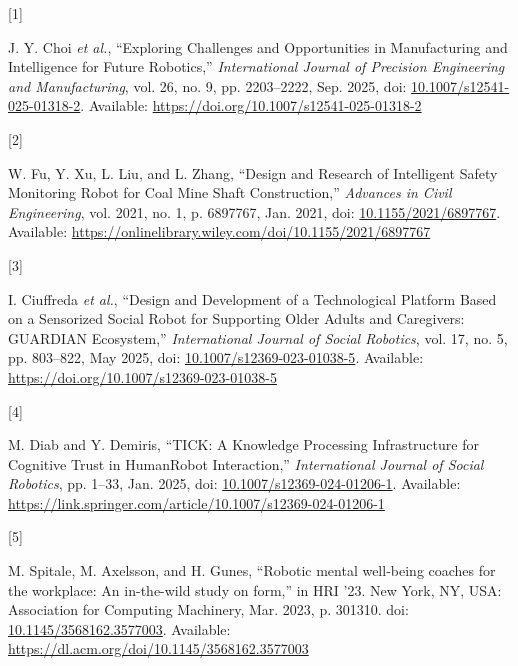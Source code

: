 \documentclass[
  letterpaper,
  DIV=11,
  numbers=noendperiod]{scrartcl}
\newlength{\cslhangindent}
\newlength{\csllabelwidth}
\newenvironment{CSLReferences}[2] %
 {\begin{list}{}{%
  \setlength{\itemindent}{0pt}
  \setlength{\leftmargin}{0pt}
  \setlength{\parsep}{0pt}
  \ifodd #1
   \setlength{\leftmargin}{\cslhangindent}
   \setlength{\itemindent}{-1\cslhangindent}
  \fi
  \setlength{\itemsep}{#2\baselineskip}}}
 {\end{list}}
\newcommand{\CSLLeftMargin}[1]{\parbox[t]{\csllabelwidth}{\strut#1\strut}}
\newcommand{\CSLRightInline}[1]{\parbox[t]{\linewidth - \csllabelwidth}{\strut#1\strut}}
\begin{document}
\label{refs}
\begin{CSLReferences}{0}{0}
\CSLLeftMargin{{[}1{]} }%
\CSLRightInline{J. Y. Choi \emph{et al.}, {``Exploring Challenges and
Opportunities in Manufacturing and Intelligence for Future Robotics,''}
\emph{International Journal of Precision Engineering and Manufacturing},
vol. 26, no. 9, pp. 2203--2222, Sep. 2025, doi:
\href{https://doi.org/10.1007/s12541-025-01318-2}{10.1007/s12541-025-01318-2}.
Available: \url{https://doi.org/10.1007/s12541-025-01318-2}}

\CSLLeftMargin{{[}2{]} }%
\CSLRightInline{W. Fu, Y. Xu, L. Liu, and L. Zhang, {``Design and
Research of Intelligent Safety Monitoring Robot for Coal Mine Shaft
Construction,''} \emph{Advances in Civil Engineering}, vol. 2021, no. 1,
p. 6897767, Jan. 2021, doi:
\href{https://doi.org/10.1155/2021/6897767}{10.1155/2021/6897767}.
Available:
\url{https://onlinelibrary.wiley.com/doi/10.1155/2021/6897767}}

\CSLLeftMargin{{[}3{]} }%
\CSLRightInline{I. Ciuffreda \emph{et al.}, {``Design and Development of
a Technological Platform Based on a Sensorized Social Robot for
Supporting Older Adults and Caregivers: GUARDIAN Ecosystem,''}
\emph{International Journal of Social Robotics}, vol. 17, no. 5, pp.
803--822, May 2025, doi:
\href{https://doi.org/10.1007/s12369-023-01038-5}{10.1007/s12369-023-01038-5}.
Available: \url{https://doi.org/10.1007/s12369-023-01038-5}}

\CSLLeftMargin{{[}4{]} }%
\CSLRightInline{M. Diab and Y. Demiris, {``TICK: A Knowledge Processing
Infrastructure for Cognitive Trust in Human{\textendash}Robot
Interaction,''} \emph{International Journal of Social Robotics}, pp.
1--33, Jan. 2025, doi:
\href{https://doi.org/10.1007/s12369-024-01206-1}{10.1007/s12369-024-01206-1}.
Available:
\url{https://link.springer.com/article/10.1007/s12369-024-01206-1}}

\CSLLeftMargin{{[}5{]} }%
\CSLRightInline{M. Spitale, M. Axelsson, and H. Gunes, {``Robotic mental
well-being coaches for the workplace: An in-the-wild study on form,''}
in HRI '23. New York, NY, USA: Association for Computing Machinery, Mar.
2023, p. 301310. doi:
\href{https://doi.org/10.1145/3568162.3577003}{10.1145/3568162.3577003}.
Available: \url{https://dl.acm.org/doi/10.1145/3568162.3577003}}


\end{CSLReferences}
\end{document}

